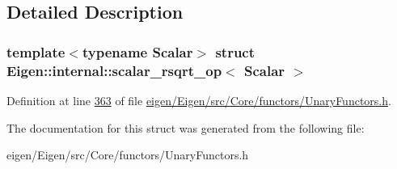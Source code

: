 \subsection{Detailed Description}
\subsubsection*{template$<$typename Scalar$>$\newline
struct Eigen\+::internal\+::scalar\+\_\+rsqrt\+\_\+op$<$ Scalar $>$}



Definition at line \hyperlink{eigen_2_eigen_2src_2_core_2functors_2_unary_functors_8h_source_l00363}{363} of file \hyperlink{eigen_2_eigen_2src_2_core_2functors_2_unary_functors_8h_source}{eigen/\+Eigen/src/\+Core/functors/\+Unary\+Functors.\+h}.



The documentation for this struct was generated from the following file\+:\begin{DoxyCompactItemize}
\item 
eigen/\+Eigen/src/\+Core/functors/\+Unary\+Functors.\+h\end{DoxyCompactItemize}
